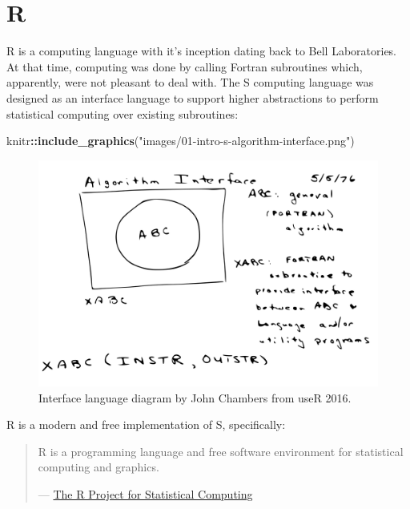 \documentclass[]{book}
\newenvironment{Shaded}{\begin{snugshade}}{\end{snugshade}}
\newcommand{\KeywordTok}[1]{\textcolor[rgb]{0.13,0.29,0.53}{\textbf{#1}}}
\newcommand{\StringTok}[1]{\textcolor[rgb]{0.31,0.60,0.02}{#1}}
\newcommand{\OperatorTok}[1]{\textcolor[rgb]{0.81,0.36,0.00}{\textbf{#1}}}
\newcommand{\NormalTok}[1]{#1}
\theoremstyle{definition}
\theoremstyle{definition}
\theoremstyle{definition}
\theoremstyle{remark}
\begin{document}
\section{R}\label{r}

R is a computing language with it's inception dating back to Bell
Laboratories. At that time, computing was done by calling Fortran
subroutines which, apparently, were not pleasant to deal with. The S
computing language was designed as an interface language to support
higher abstractions to perform statistical computing over existing
subroutines:

\begin{Shaded}
\begin{Highlighting}[]
\NormalTok{knitr}\OperatorTok{::}\KeywordTok{include_graphics}\NormalTok{(}\StringTok{"images/01-intro-s-algorithm-interface.png"}\NormalTok{)}
\end{Highlighting}
\end{Shaded}

\begin{figure}
\includegraphics[width=22.22in]{images/01-intro-s-algorithm-interface} \caption{Interface language diagram by John Chambers from useR 2016.}\label{fig:s-diagram}
\end{figure}

R is a modern and free implementation of S, specifically:

\begin{quote}
R is a programming language and free software environment for
statistical computing and graphics.

--- \href{https://www.r-project.org/}{The R Project for Statistical
Computing}
\end{quote}
\end{document}
